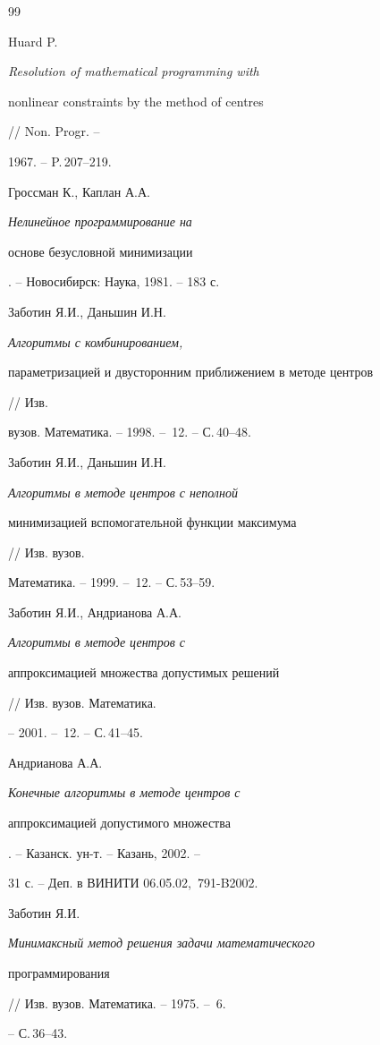 \begin{thebibliography}{99}







Huard P. {\it Resolution of mathematical programming with


nonlinear constraints by the method of centres} // Non. Progr. --


1967. -- P.\,207--219.




Гроссман К., Каплан А.А. {\it Нелинейное программирование на


основе безусловной минимизации}. -- Новосибирск: Наука, 1981. -- 183 с.




Заботин Я.И., Даньшин И.Н. {\it Алгоритмы с комбинированием,


параметризацией и двусторонним приближением в методе центров} // Изв.


вузов. Математика. -- 1998. -- \No\,12. -- С.\,40--48.




Заботин Я.И., Даньшин И.Н. {\it Алгоритмы в методе центров с неполной


минимизацией вспомогательной функции максимума} // Изв. вузов.


Математика. -- 1999. -- \No\,12. -- С.\,53--59.




Заботин Я.И., Андрианова А.А. {\it Алгоритмы в методе центров с


аппроксимацией множества допустимых решений} // Изв. вузов. Математика.


-- 2001. -- \No\,12. -- С.\,41--45.




Андрианова А.А. {\it Конечные алгоритмы в методе центров с


аппроксимацией допустимого множества}. -- Казанск. ун-т. -- Казань, 2002. --


31 с. -- Деп. в ВИНИТИ 06.05.02, \No\,791-B2002.




Заботин Я.И. {\it Минимаксный метод решения задачи математического


программирования} // Изв. вузов. Математика. -- 1975. -- \No\,6.


-- С.\,36--43.





\end{thebibliography}
